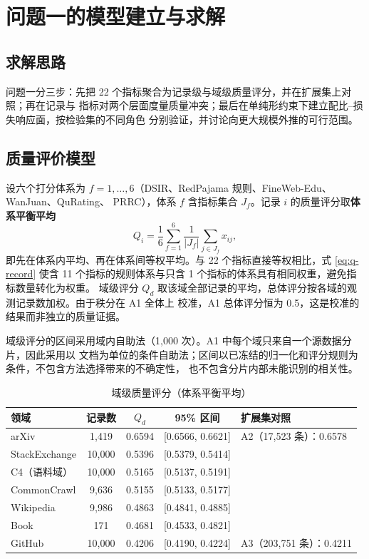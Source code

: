 \section{问题一的模型建立与求解}

\subsection{求解思路}

问题一分三步：先把 22 个指标聚合为记录级与域级质量评分，并在扩展集上对照；再在记录与
指标对两个层面度量质量冲突；最后在单纯形约束下建立配比–损失响应面，按检验集的不同角色
分别验证，并讨论向更大规模外推的可行范围。

\subsection{质量评价模型}

设六个打分体系为 $f=1,\dots,6$（DSIR、RedPajama 规则、FineWeb-Edu、WanJuan、QuRating、
PRRC），体系 $f$ 含指标集合 $J_f$。记录 $i$ 的质量评分取\textbf{体系平衡平均}
\begin{equation}
  Q_i=\frac{1}{6}\sum_{f=1}^{6}\frac{1}{|J_f|}\sum_{j\in J_f}x_{ij},
  \label{eq:q-record}
\end{equation}
即先在体系内平均、再在体系间等权平均。与 22 个指标直接等权相比，式 \eqref{eq:q-record}
使含 11 个指标的规则体系与只含 1 个指标的体系具有相同权重，避免指标数量转化为权重。
域级评分 $Q_d$ 取该域全部记录的平均，总体评分按各域的观测记录数加权。由于秩分在 A1 全体上
校准，A1 总体评分恒为 0.5，这是校准的结果而非独立的质量证据。

域级评分的区间采用域内自助法（1,000 次）。A1 中每个域只来自一个源数据分片，因此采用以
文档为单位的条件自助法；区间以已冻结的归一化和评分规则为条件，不包含方法选择带来的不确定性，
也不包含分片内部未能识别的相关性。

\begin{table}[htbp]
  \centering
  \caption{域级质量评分（体系平衡平均）}
  \label{tab:q1-domain}
  \begin{tabular}{lcccl}
    \toprule
    领域 & 记录数 & $Q_d$ & 95\% 区间 & 扩展集对照 \\
    \midrule
    arXiv & 1,419 & 0.6594 & [0.6566, 0.6621] & A2（17,523 条）：0.6578 \\
    StackExchange & 10,000 & 0.5396 & [0.5379, 0.5414] & \\
    C4（语料域） & 10,000 & 0.5165 & [0.5137, 0.5191] & \\
    CommonCrawl & 9,636 & 0.5155 & [0.5133, 0.5177] & \\
    Wikipedia & 9,986 & 0.4863 & [0.4841, 0.4885] & \\
    Book & 171 & 0.4681 & [0.4533, 0.4821] & \\
    GitHub & 10,000 & 0.4206 & [0.4190, 0.4224] & A3（203,751 条）：0.4211 \\
    \bottomrule
  \end{tabular}
\end{table}

